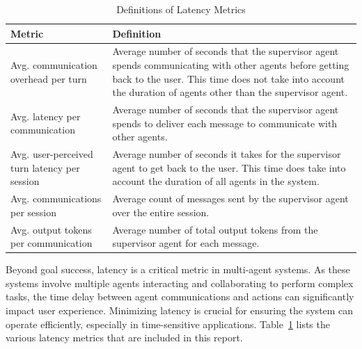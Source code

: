 \begin{table}[t]
    \caption{Definitions of Latency Metrics}
    \label{tab:latency_define}
    \centering
    \footnotesize
    \begin{tabular}{p{3cm}p{9cm}}
    \toprule
    Metric  & Definition  \\
    \midrule
    Avg. communication overhead per turn & Average number of seconds that the supervisor agent spends communicating with other agents before getting back to the user. This time does not take into account the duration of agents other than the supervisor agent. \\
    \midrule
    Avg. latency per communication & Average number of seconds that the supervisor agent spends to deliver each message to communicate with other agents. \\
    \midrule
    Avg. user-perceived turn latency per session & Average number of seconds it takes for the supervisor agent to get back to the user. This time does take into account the duration of all agents in the system. \\
    \midrule
    Avg. communications per session & Average count of messages sent by the supervisor agent over the entire session. \\
    \midrule
    Avg. output tokens per communication & Average number of total output tokens from the supervisor agent for each message. \\
    \bottomrule
    \end{tabular}
\end{table}



Beyond goal success, latency is a critical metric in multi-agent systems. As these systems involve multiple agents interacting and collaborating to perform complex tasks, the time delay between agent communications and actions can significantly impact user experience. Minimizing latency is crucial for ensuring the system can operate efficiently, especially in time-sensitive applications. Table~\ref{tab:latency_define} lists the various latency metrics that are included in this report.


